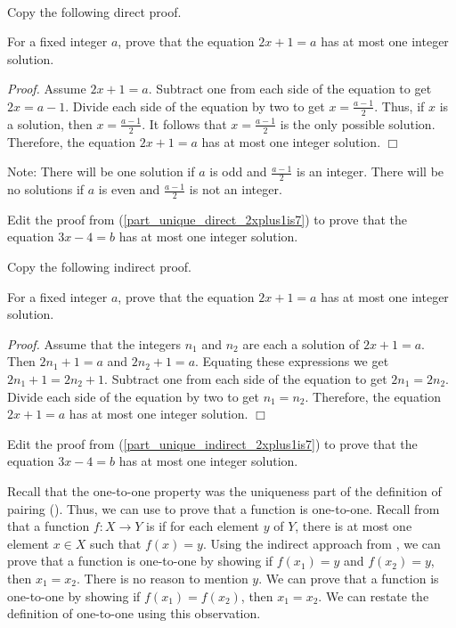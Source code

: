 \begin{act}
\label{act_uniqueness}
~   
    \begin{actpart}      
        \item \label{part_unique_direct_2xplus1is7} Copy the following direct proof.
        
        For a fixed integer $a$, prove that the equation $2x+1 = a$ has at most one integer solution.

        \emph{Proof.}  Assume $2x+1 = a$.  Subtract one from each side of the equation to get $2x = a-1$. Divide each side of the equation by two to get $x = \frac{a-1}{2}$.  Thus, if $x$ is a solution, then $x = \frac{a-1}{2}$.  It follows that $x = \frac{a-1}{2}$ is the only possible solution. Therefore, the equation $2x+1=a$ has at most one integer solution. $\Box$

        Note: There will be one solution if $a$ is odd and $\frac{a-1}{2}$ is an integer. There will be no solutions if $a$ is even and $\frac{a-1}{2}$ is not an integer.

        \item Edit the proof from (\ref{part_unique_direct_2xplus1is7}) to prove that the equation $3x-4=b$ has at most one integer solution.

        \item \label{part_unique_indirect_2xplus1is7} Copy the following indirect proof.
        
        For a fixed integer $a$, prove that the equation $2x+1 = a$ has at most one integer solution.

        \emph{Proof.}  Assume that the integers $n_1$ and $n_2$ are each a solution of $2x+1=a$.  Then $2n_1+1=a$ and $2n_2+1=a$.  Equating these expressions we get $2n_1+1 = 2n_2+1.$
        Subtract one from each side of the equation to get $2n_1 = 2n_2.$ Divide each side of the equation by two to get $n_1 = n_2$.  Therefore, the equation $2x+1=a$ has at most one integer solution. $\Box$

        \item Edit the proof from (\ref{part_unique_indirect_2xplus1is7}) to prove that the equation $3x-4=b$ has at most one integer solution.
    \end{actpart}
\end{act}

Recall that the one-to-one property was the uniqueness part of the definition of pairing ().  Thus, we can use  to prove that a function is one-to-one.  Recall from  that a function $f: X \to Y$ is   if for each element $y$ of $Y$, there is at most one element $x \in X$ such that $f(x) =y$. Using the indirect approach from , we can prove that a function is one-to-one by showing if $f(x_1) = y$ and $f(x_2)=y$, then  $x_1=x_2$. There is no reason to mention $y$.  We can prove that a function is one-to-one by showing if $f(x_1) = f(x_2)$, then  $x_1=x_2$. We can restate the definition of one-to-one using this observation.

